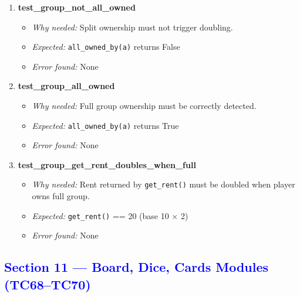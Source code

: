 \documentclass{article}
\begin{document}
\begin{enumerate}[resume, label=\textbf{TC\arabic*.}]

  \item \textbf{test\_group\_not\_all\_owned}
  \begin{itemize}[noitemsep]
    \item \textit{Why needed:} Split ownership must not trigger doubling.
    \item \textit{Expected:} \texttt{all\_owned\_by(a)} returns False
    \item \textit{Error found:} None
  \end{itemize}

  \item \textbf{test\_group\_all\_owned}
  \begin{itemize}[noitemsep]
    \item \textit{Why needed:} Full group ownership must be correctly detected.
    \item \textit{Expected:} \texttt{all\_owned\_by(a)} returns True
    \item \textit{Error found:} None
  \end{itemize}

  \item \textbf{test\_group\_get\_rent\_doubles\_when\_full}
  \begin{itemize}[noitemsep]
    \item \textit{Why needed:} Rent returned by \texttt{get\_rent()} must be doubled when player owns full group.
    \item \textit{Expected:} \texttt{get\_rent()} == 20 (base 10 $\times$ 2)
    \item \textit{Error found:} None
  \end{itemize}

\end{enumerate}

\subsection*{\textcolor{blue}{Section 11 — Board, Dice, Cards Modules (TC68--TC70)}}
\end{document}
